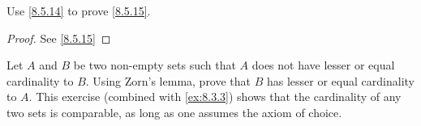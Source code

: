 \begin{ex}\label{ex:8.5.14}
  Use \cref{8.5.14} to prove \cref{8.5.15}.
\end{ex}

\begin{proof}
  See \cref{8.5.15}
\end{proof}

\begin{ex}\label{ex:8.5.15}
  Let \(A\) and \(B\) be two non-empty sets such that \(A\) does not have lesser or equal cardinality to \(B\).
  Using Zorn's lemma, prove that \(B\) has lesser or equal cardinality to \(A\).
  This exercise (combined with \cref{ex:8.3.3}) shows that the cardinality of any two sets is comparable, as long as one assumes the axiom of choice.
\end{ex}

